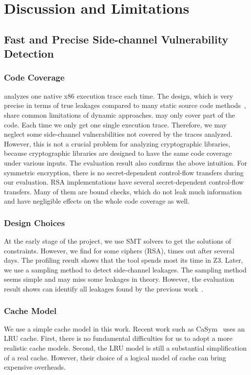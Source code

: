 \chapter{Discussion and Limitations}
\section{Fast and Precise Side-channel Vulnerability Detection}
\subsection*{Code Coverage} \detect{} analyzes one native x86 execution trace each time. The design, which is very precise in terms of true leakages compared to many static source code methods~\cite{197207,BacelarAlmeida:2013:FVS:2483313.2483334}, share common limitations of dynamic approaches. \detect{} may only cover part of the code. Each time we only get one single execution trace. Therefore, we may neglect some side-channel vulnerabilities not covered by the traces analyzed. However, this is not a crucial problem for analyzing cryptographic libraries, because cryptographic libraries are designed to have the same code coverage under various inputs. The evaluation result also confirms the above intuition. For symmetric encryption, there is no secret-dependent control-flow transfers during our evaluation. RSA implementations have several secret-dependent control-flow transfers. Many of them are bound checks, which do not leak much information and have negligible effects on the whole code coverage as well.

\subsection*{Design Choices} At the early stage of the project, we use SMT solvers to get the solutions of constraints. However, we find for some ciphers (RSA), \detect{} times out after several days. The profiling result shows that the tool spends most its time in Z3. Later, we use a sampling method to detect side-channel leakages. The sampling method seems simple and may miss some leakages in theory. However, the evaluation result shows \detect{} can identify all leakages found by the previous work~\cite{203878,236338,Brotzman19Casym}.  

\subsection*{Cache Model} We use a simple cache model in this work. Recent work such as CaSym~\cite{Brotzman19Casym,182946} uses an LRU cache. First, there is no fundamental difficulties for us to adopt a more realistic cache models. Second, the LRU model is still a substantial simplification of a real cache. However, their choice of a logical model of cache can bring expensive overheads. 

